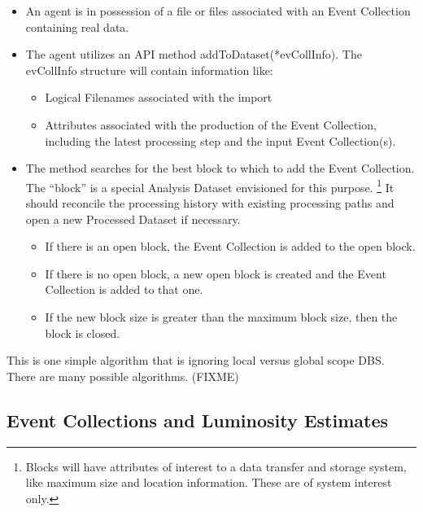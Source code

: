 \documentclass{cmspaper}
\begin{document}
{\begin{itemize}
\item An agent is in possession of a file or files associated with an
Event Collection containing real data.

\item The agent utilizes an API method addToDataset(*evCollInfo). The 
evCollInfo structure will contain information like: 
\begin{itemize}

\item Logical Filenames associated with the import

\item Attributes associated with the production of the Event Collection, 
including the latest processing step and the input Event Collection(s). 
\end{itemize}

\item The method searches for the best block to which to add the Event 
      Collection. The ``block'' is a special Analysis Dataset envisioned
      for this purpose. \footnote{Blocks will have attributes of
      interest to a data transfer and storage system, like maximum size
      and location information. These are of system interest only.} It
      should reconcile the processing history with existing processing
      paths and open a new Processed Dataset if necessary.

\begin{itemize}

\item If there is an open block, the Event Collection is added to the open 
      block.

\item If there is no open block, a new open block is created and the Event 
      Collection is added to that one.

\item If the new block size is greater than the maximum block size, then 
      the block is closed.  

\end{itemize}

\end{itemize}

This is one simple algorithm that is ignoring local versus global scope DBS.  
There are many possible algorithms.  (FIXME)


\subsection{ Event Collections and Luminosity Estimates}

}
\end{document}
